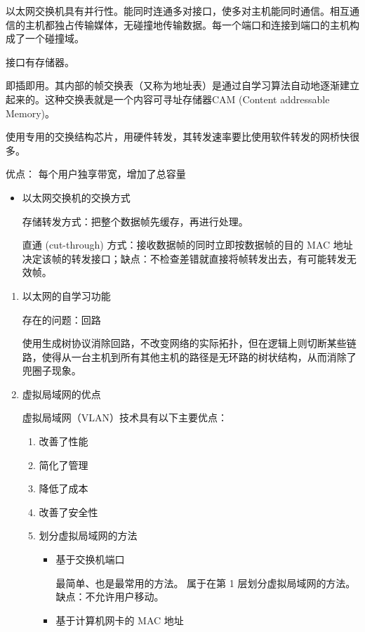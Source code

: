 \documentclass[11pt]{article}
\begin{document}
\begin{enumerate}
\begin{enumerate}
以太网交换机具有并行性。能同时连通多对接口，使多对主机能同时通信。相互通信的主机都独占传输媒体，无碰撞地传输数据。每一个端口和连接到端口的主机构成了一个碰撞域。

接口有存储器。

即插即用。其内部的帧交换表（又称为地址表）是通过自学习算法自动地逐渐建立起来的。这种交换表就是一个内容可寻址存储器CAM (Content addressable Memory)。

使用专用的交换结构芯片，用硬件转发，其转发速率要比使用软件转发的网桥快很多。

优点：
每个用户独享带宽，增加了总容量

\begin{itemize}
\item 以太网交换机的交换方式

存储转发方式：把整个数据帧先缓存，再进行处理。

直通 (cut-through) 方式：接收数据帧的同时立即按数据帧的目的 MAC 地址决定该帧的转发接口；缺点：不检查差错就直接将帧转发出去，有可能转发无效帧。
\end{itemize}
\begin{enumerate}
\item 以太网的自学习功能
\label{sec:org4a65a5a}

存在的问题：回路

使用生成树协议消除回路，不改变网络的实际拓扑，但在逻辑上则切断某些链路，使得从一台主机到所有其他主机的路径是无环路的树状结构，从而消除了兜圈子现象。
\item 虚拟局域网的优点
\label{sec:org1518001}

虚拟局域网（VLAN）技术具有以下主要优点：

\begin{enumerate}
\item 改善了性能

\item 简化了管理

\item 降低了成本

\item 改善了安全性

\item 划分虚拟局域网的方法
\begin{itemize}
\item 基于交换机端口

最简单、也是最常用的方法。
属于在第 1 层划分虚拟局域网的方法。
缺点：不允许用户移动。

\item 基于计算机网卡的 MAC 地址


\end{itemize}
\end{enumerate}
\end{enumerate}
\end{enumerate}
\end{enumerate}
\end{document}
